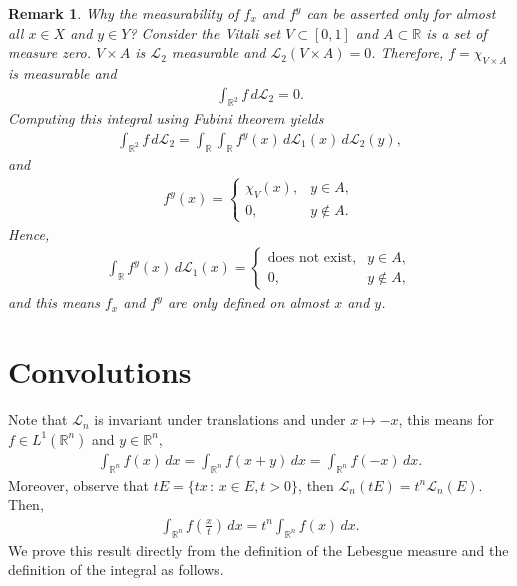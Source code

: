 \documentclass[11pt]{book}
\newtheorem{remark}{Remark}[chapter]
\theoremstyle{definition}
\numberwithin{equation}{chapter}
\def\L{{\mathcal L}}
\begin{document}
\medskip

\begin{remark}
Why the measurability of $f_x$ and $f^y$ can be asserted only for almost all $x \in X$ and $y \in Y$? Consider the Vitali set $V \subset [0,1]$ and $A \subset \mathbb{R}$ is a set of measure zero. $V \times A$ is $\L_2$ measurable and $\L_2(V \times A) = 0$. Therefore, $f = \chi_{V \times A}$ is measurable and
\begin{align*}
    \int_{\mathbb{R}^2} f\,d\L_2 = 0.
\end{align*}
Computing this integral using Fubini theorem yields
\begin{align*}
    \int_{\mathbb{R}^2} f\,d\L_2 = \int_{\mathbb{R}} \int_{\mathbb{R}} f^y(x)\, d\L_1(x) \, d\L_2(y),
\end{align*}
and 
\begin{align*}
    f^y(x) = \begin{cases}
        \chi_V(x), & y \in A, \\
        0, & y \notin A.
    \end{cases}
\end{align*}
Hence,
\begin{align*}
    \int_{\mathbb{R}} f^y(x)\, d\L_1(x) = \begin{cases}
        \text{does not exist}, & y \in A, \\
        0, & y \notin A,
    \end{cases}
\end{align*}
and this means $f_x$ and $f^y$ are only defined on almost $x$ and $y$.
\end{remark}

\medskip


\section{Convolutions}

Note that $\L_n$ is invariant under translations and under $x \mapsto -x$, this means for $f \in L^1(\mathbb{R}^n)$ and $y \in \mathbb{R}^n$,
\begin{align*}
    \int_{\mathbb{R}^n} f(x) \,dx = \int_{\mathbb{R}^n} f(x + y) \,dx = \int_{\mathbb{R}^n} f(-x) \,dx.
\end{align*}
Moreover, observe that $tE = \{tx \,:\, x \in E, t > 0\}$, then $\L_n(tE) = t^n \L_n(E)$. Then,
\begin{align*}
    \int_{\mathbb{R}^n} f\left(\frac{x}{t}\right) \,dx = t^n \int_{\mathbb{R}^n} f(x) \,dx.
\end{align*}
We prove this result directly from the definition of the Lebesgue measure and the definition of the integral as follows.
\end{document}
